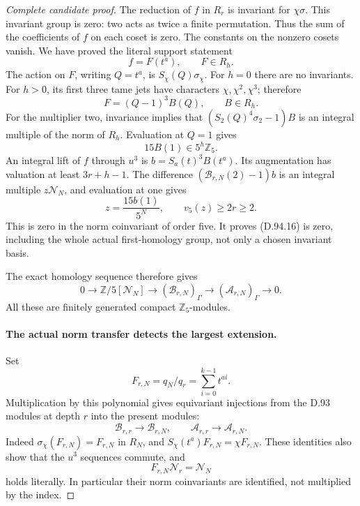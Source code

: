 \begin{proof}[Complete candidate proof]
The reduction of \(f\) in \(R_r\) is invariant for
\(\chi\sigma\). This invariant group is zero: two acts
as twice a finite permutation. Thus the sum of the
coefficients of \(f\) on each coset is zero. The constants
on the nonzero cosets vanish. We have proved the literal
support statement
\[
                      f=F(t^a),\qquad F\in R_h.
                                                        \tag{D.94.17}
\]
The action on \(F\), writing \(Q=t^a\), is
\(S_\chi(Q)\sigma_\chi\). For \(h=0\) there are no
invariants. For \(h>0\), its first three tame jets have
characters \(\chi,\chi^2,\chi^3\); therefore
\[
                  F=(Q-1)^3B(Q),\qquad B\in R_h.
                                                        \tag{D.94.18}
\]
For the multiplier two, invariance implies that
\((S_2(Q)^4\sigma_2-1)B\) is an integral multiple of
the norm of \(R_h\). Evaluation at \(Q=1\) gives
\[
                         15B(1)\in5^h\mathbb Z_5.
                                                        \tag{D.94.19}
\]
An integral lift of \(f\) through \(u^3\) is
\(b=S_a(t)^3B(t^a)\). Its augmentation has valuation
at least \(3r+h-1\). The difference
\((\mathscr B_{r,N}(2)-1)b\) is an integral multiple
\(z\mathcal N_N\), and evaluation at one gives
\[
                  z=\frac{15b(1)}{5^N},\qquad
                         v_5(z)\ge2r\ge2.
                                                        \tag{D.94.20}
\]
This is zero in the norm coinvariant of order five.
It proves (D.94.16) is zero, including the whole actual
first-homology group, not only a chosen invariant basis.

The exact homology sequence therefore gives
\[
 0\longrightarrow\mathbb Z/5[\mathcal N_N]
 \longrightarrow(\mathscr B_{r,N})_\Gamma
 \longrightarrow(\mathscr A_{r,N})_\Gamma
 \longrightarrow0.
                                                        \tag{D.94.21}
\]
All these are finitely generated compact \(\mathbb Z_5\)-modules.

\paragraph{The actual norm transfer detects the largest extension.}
Set
\[
           F_{r,N}=q_N/q_r=\sum_{i=0}^{k-1}t^{ai}.
                                                        \tag{D.94.22}
\]
Multiplication by this polynomial gives equivariant injections
from the D.93 modules at depth \(r\) into the present modules:
\[
 \mathscr B_{r,r}\longrightarrow\mathscr B_{r,N},
       \qquad \mathscr A_{r,r}\longrightarrow\mathscr A_{r,N}.
                                                        \tag{D.94.23}
\]
Indeed \(\sigma_\chi(F_{r,N})=F_{r,N}\) in \(R_N\),
and \(S_\chi(t^a)F_{r,N}=\chi F_{r,N}\). These identities
also show that the \(u^3\) sequences commute, and
\[
                    F_{r,N}\mathcal N_r=\mathcal N_N
                                                        \tag{D.94.24}
\]
holds literally. In particular their norm coinvariants
are identified, not multiplied by the index.


\end{proof}

